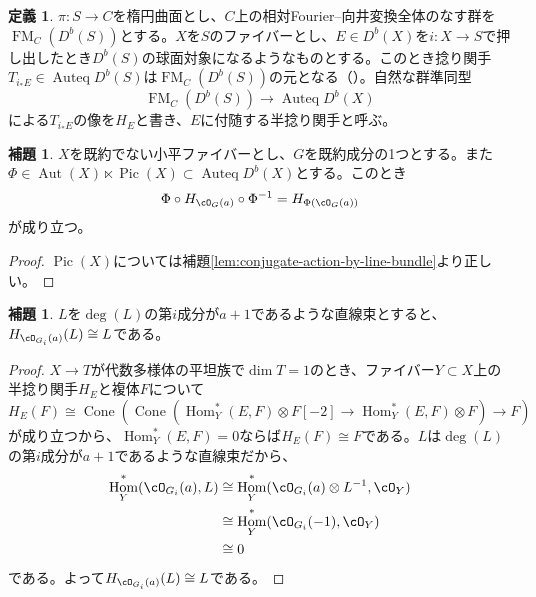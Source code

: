 \documentclass[uplatex, a4paper, dvipdfmx]{jsarticle}
\theoremstyle{definition}
\newtheorem{definition}[theorem]{定義}
\newtheorem{lemma}[theorem]{補題}
\DeclareMathOperator{\Hom}{\mathrm{Hom}}
\DeclareMathOperator{\Auteq}{\mathrm{Auteq}}
\DeclareMathOperator{\Cone}{\mathrm{Cone}}
\DeclareMathOperator{\Pic}{\mathrm{Pic}}
\DeclareMathOperator{\Aut}{\mathrm{Aut}}
\DeclareMathOperator{\FM}{\mathrm{FM}}
\begin{document}
\begin{definition}
    $\pi \colon S \to C$を楕円曲面とし、$C$上の相対Fourier--向井変換全体のなす群を$\FM_C(D^b(S))$とする。$X$を$S$のファイバーとし、$E \in D^b(X)$を$i \colon X \to S$で押し出したとき$D^b(S)$の球面対象になるようなものとする。このとき捻り関手$T_{i_*E} \in \Auteq D^b(S)$は$\FM_C(D^b(S))$の元となる（\cite{2023arXiv230212501A}）。自然な群準同型
    \begin{equation}
        \FM_C(D^b(S)) \to \Auteq D^b(X)
    \end{equation}
    による$T_{i_*E}$の像を$H_E$と書き、$E$に付随する半捻り関手と呼ぶ。
\end{definition}
\begin{lemma}\label{lem:conjugate-action}
    $X$を既約でない小平ファイバーとし、$G$を既約成分の1つとする。また$\Phi \in \Aut(X) \ltimes \Pic(X) \subset \Auteq D^b(X)$とする。このとき
    \begin{equation}
        \Phi \circ H_{\cO_G(a)}\circ \Phi^{-1} = H_{\Phi(\cO_G(a))}
    \end{equation}
    が成り立つ。
\end{lemma}
\begin{proof}
    $\Pic(X)$については補題\ref{lem:conjugate-action-by-line-bundle}より正しい。
\end{proof}
\begin{lemma}\label{lem:preserved-line-bundle}
    $L$を$\deg(L)$の第$i$成分が$a+1$であるような直線束とすると、$H_{\cO_{G_i}(a)}(L) \cong L$である。
\end{lemma}
\begin{proof}
    $X \to T$が代数多様体の平坦族で$\dim T= 1$のとき、ファイバー$Y \subset X$上の半捻り関手$H_E$と複体$F$について
    \begin{equation}
        H_E(F) \cong \Cone\left(\Cone(\Hom^*_Y(E, F) \otimes F[-2] \to \Hom^*_Y(E, F) \otimes F) \to F\right)
    \end{equation}
    が成り立つから、$\Hom^*_Y(E, F) = 0$ならば$H_E(F) \cong F$である。$L$は$\deg(L)$の第$i$成分が$a+1$であるような直線束だから、
    \begin{align}
        \Hom^*_Y(\cO_{G_i}(a), L) & \cong \Hom^*_Y(\cO_{G_i}(a)\otimes L^{-1}, \cO_Y) \\
                                  & \cong \Hom_Y^*(\cO_{G_i}(-1), \cO_Y)              \\
                                  & \cong 0
    \end{align}
    である。よって$H_{\cO_{G_i}(a)}(L) \cong L$である。
\end{proof}
\end{document}
